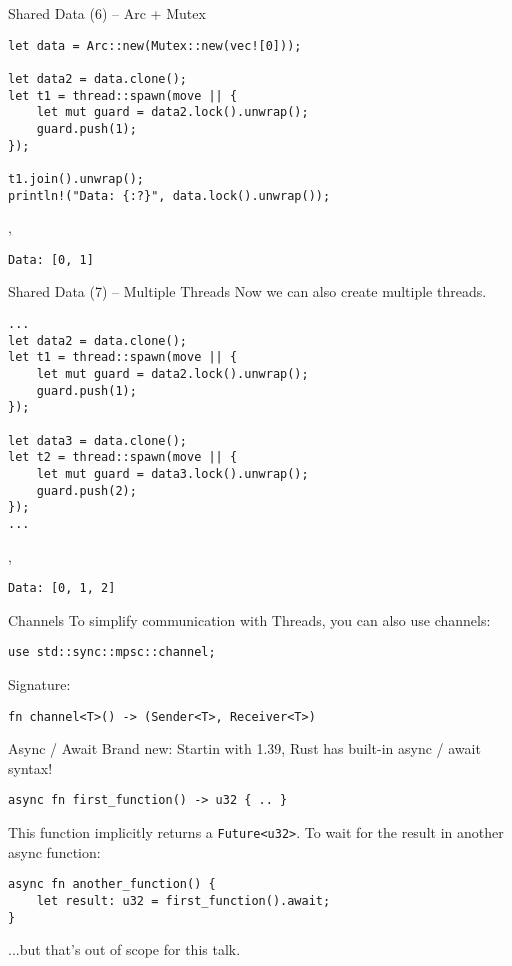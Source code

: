 \begin{frame}[fragile]{Shared Data (6) -- Arc + Mutex}
\begin{verbatim}
let data = Arc::new(Mutex::new(vec![0]));

let data2 = data.clone();
let t1 = thread::spawn(move || {
    let mut guard = data2.lock().unwrap();
    guard.push(1);
});

t1.join().unwrap();
println!("Data: {:?}", data.lock().unwrap());
\end{verbatim}
\sep
\begin{verbatim}
Data: [0, 1]
\end{verbatim}
\end{frame}

\begin{frame}[fragile]{Shared Data (7) -- Multiple Threads}
Now we can also create multiple threads.
\begin{verbatim}
...
let data2 = data.clone();
let t1 = thread::spawn(move || {
    let mut guard = data2.lock().unwrap();
    guard.push(1);
});

let data3 = data.clone();
let t2 = thread::spawn(move || {
    let mut guard = data3.lock().unwrap();
    guard.push(2);
});
...
\end{verbatim}
\sep
\begin{verbatim}
Data: [0, 1, 2]
\end{verbatim}
\end{frame}

\begin{frame}[fragile]{Channels}
To simplify communication with Threads, you can also use channels:
\begin{verbatim}
use std::sync::mpsc::channel;
\end{verbatim}
Signature:
\begin{verbatim}
fn channel<T>() -> (Sender<T>, Receiver<T>)
\end{verbatim}
\end{frame}

\begin{frame}[fragile]{Async / Await}
Brand new: Startin with 1.39, Rust has built-in async / await syntax!
\begin{verbatim}
async fn first_function() -> u32 { .. }
\end{verbatim}

This function implicitly returns a \texttt{Future<u32>}. To wait
for the result in another async function:

\begin{verbatim}
async fn another_function() {
    let result: u32 = first_function().await;
}
\end{verbatim}

...but that's out of scope for this talk.
\end{frame}
